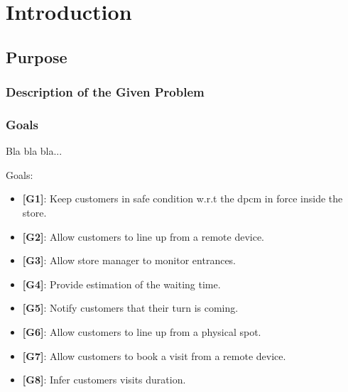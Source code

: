 \chapter{Introduction}

\section{Purpose}

\subsection{Description of the Given Problem}

\subsection{Goals}

Bla bla bla...

Goals:
\begin{itemize}

	\item {\textbf{[G1]}}: Keep customers in safe condition w.r.t the \gls{dpcm} in force inside the store.
	
		
	\item {\textbf{[G2]}}: Allow customers to line up from a remote device.
		
	\item {\textbf{[G3]}}: Allow store manager to monitor entrances.
	
	\item {\textbf{[G4]}}: Provide estimation of the waiting time.
	
	\item {\textbf{[G5]}}: Notify customers that their turn is coming.
	
	\item {\textbf{[G6]}}: Allow customers to line up from a physical spot.

	\item {\textbf{[G7]}}: Allow customers to book a visit from a remote device.

	\item {\textbf{[G8]}}: Infer customers visits duration.
	
\end{itemize}

